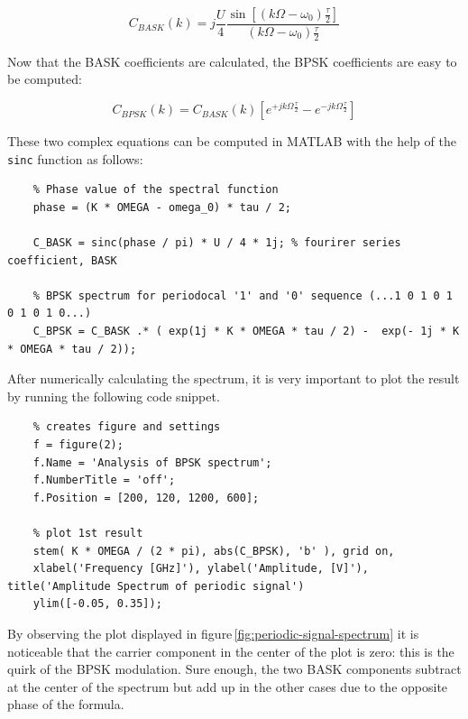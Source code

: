 \begin{equation*}
    C_{BASK}(k) = j\frac{U}{4} \frac{\sin\left[ \left( k\Omega - \omega_0 \right) \frac{\tau}{2}\right]}{\left( k\Omega - \omega_0 \right) \frac{\tau}{2}}
\end{equation*}

\noindent Now that the BASK coefficients are calculated, the BPSK coefficients are easy to be computed:

\begin{equation*}
    C_{BPSK}(k) = C_{BASK}(k) \left[ e^{+jk\Omega\frac{\tau}{2}} - e^{-jk\Omega\frac{\tau}{2}} \right]
\end{equation*}

\noindent These two complex equations can be computed in MATLAB with the help of the \texttt{sinc} function as follows:

\begin{lstlisting}
    % Phase value of the spectral function
    phase = (K * OMEGA - omega_0) * tau / 2;

    C_BASK = sinc(phase / pi) * U / 4 * 1j; % fourirer series coefficient, BASK

    % BPSK spectrum for periodocal '1' and '0' sequence (...1 0 1 0 1 0 1 0 1 0...)
    C_BPSK = C_BASK .* ( exp(1j * K * OMEGA * tau / 2) -  exp(- 1j * K * OMEGA * tau / 2));
\end{lstlisting}

\noindent After numerically calculating the spectrum, it is very important to plot the result by running the following code snippet.

\begin{lstlisting}
    % creates figure and settings
    f = figure(2);
    f.Name = 'Analysis of BPSK spectrum';
    f.NumberTitle = 'off';
    f.Position = [200, 120, 1200, 600];
    
    % plot 1st result
    stem( K * OMEGA / (2 * pi), abs(C_BPSK), 'b' ), grid on,
    xlabel('Frequency [GHz]'), ylabel('Amplitude, [V]'), title('Amplitude Spectrum of periodic signal')
    ylim([-0.05, 0.35]);
\end{lstlisting}

\noindent By observing the plot displayed in figure\,\ref{fig:periodic-signal-spectrum} it is noticeable that the carrier component in the center of the plot is zero: this is the quirk of the BPSK modulation. Sure enough, the two BASK components subtract at the center of the spectrum but add up in the other cases due to the opposite phase of the formula. 

